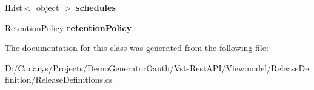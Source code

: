 \begin{DoxyCompactItemize}
I\+List$<$ object $>$ {\bfseries schedules}
\item 
\mbox{\label{class_vsts_rest_a_p_i_1_1_viewmodel_1_1_release_definition_1_1_release_definitions_1_1_environment_aa663455adc46f106e23854ce08341f69}} 
\mbox{\hyperlink{class_vsts_rest_a_p_i_1_1_viewmodel_1_1_release_definition_1_1_release_definitions_1_1_retention_policy}{Retention\+Policy}} {\bfseries retention\+Policy}
\end{DoxyCompactItemize}


The documentation for this class was generated from the following file\+:\begin{DoxyCompactItemize}
\item 
D\+:/\+Canarys/\+Projects/\+Demo\+Generator\+Oauth/\+Vsts\+Rest\+A\+P\+I/\+Viewmodel/\+Release\+Definition/Release\+Definitions.\+cs\end{DoxyCompactItemize}
